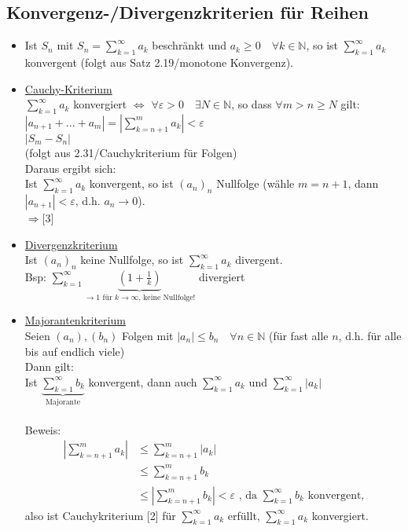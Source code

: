 \documentclass[12pt, titlepage]{article}
\newcommand{\N}{\mathds{N}}
\renewcommand{\>}{\rightarrow}
\renewcommand{\*}{\cdot}
\renewcommand{\epsilon}{\varepsilon}
\begin{document}
	\subsection{Konvergenz-/Divergenzkriterien für Reihen}
	\begin{itemize}
		\item[\fbox{1}] Ist $S_n$ mit $S_n=\sum_{k=1}^{\infty}a_k$ beschränkt und $a_k\geq 0\quad\forall k\in\N$, so ist $\sum_{k=1}^{\infty}a_k$ konvergent (folgt aus Satz 2.19/monotone Konvergenz).
		\item[\fbox{2}] \underline{Cauchy-Kriterium}\\
		$\sum_{k=1}^{\infty}a_k$ konvergiert $\Leftrightarrow$ $\forall\epsilon>0\quad\exists N\in\N$, so dass $\forall m>n\geq N$ gilt: $|a_{n+1}+...+a_m|=|\sum_{k=n+1}^{m}a_k|<\epsilon$\\
		$|S_m-S_n|$\\
		(folgt aus 2.31/Cauchykriterium für Folgen)\\
		Daraus ergibt sich:\\
		Ist $\sum_{k=1}^{\infty}a_k$ konvergent, so ist $(a_n)_n$ Nullfolge (wähle $m=n+1$, dann $|a_{n+1}|<\epsilon$, d.h. $a_n\>0$).\\
		$\Rightarrow$[3]
		\item[\fbox{3}] \underline{Divergenzkriterium}\\
		Ist $(a_n)_n$ keine Nullfolge, so ist $\sum_{k=1}^{\infty}a_k$ divergent.\\
		Bsp: $\sum_{k=1}^{\infty}\underbrace{(1+\frac{1}{k})}_{\>1\textrm{ für }k\>\infty\textrm{, keine Nullfolge!}}$ divergiert
		\item[\fbox{4}] \underline{Majorantenkriterium}\\
		Seien $(a_n),(b_n)$ Folgen mit $|a_n|\leq b_n\quad\forall n\in\N$ (für fast alle $n$, d.h. für alle bis auf endlich viele)\\
		Dann gilt:\\
		Ist $\underbrace{\sum_{k=1}^{\infty}b_k}_{\textrm{Majorante}}$ konvergent, dann auch $\sum_{k=1}^{\infty}a_k$ und $\sum_{k=1}^{\infty}|a_k|$\\
		\\
		Beweis:
		\begin{align*}
			|\sum_{k=n+1}^{m}a_k|&\leq\sum_{k=n+1}^{m}|a_k|\\
			&\leq\sum_{k=n+1}^{m}b_k\\
			&\leq|\sum_{k=n+1}^{m}b_k|<\epsilon\textrm{ , da }\sum_{k=1}^{\infty}b_k\textrm{ konvergent,}
		\end{align*}
		also ist Cauchykriterium [2] für $\sum_{k=1}^{\infty}a_k$ erfüllt, $\sum_{k=1}^{\infty}a_k$ konvergiert.\\

\end{itemize}
\end{document}
